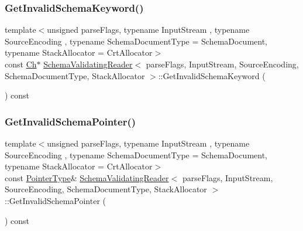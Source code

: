 \mbox{\label{classSchemaValidatingReader_ac3192b08923b4d68d04462b0b61ded1c}} 
\subsubsection{\texorpdfstring{Get\+Invalid\+Schema\+Keyword()}{GetInvalidSchemaKeyword()}}
{\footnotesize\ttfamily template$<$unsigned parse\+Flags, typename Input\+Stream , typename Source\+Encoding , typename Schema\+Document\+Type  = Schema\+Document, typename Stack\+Allocator  = Crt\+Allocator$>$ \\
const \hyperlink{classSchemaValidatingReader_a6eb6f887a49dbb400800ab4fc01f02c7}{Ch}$\ast$ \hyperlink{classSchemaValidatingReader}{Schema\+Validating\+Reader}$<$ parse\+Flags, Input\+Stream, Source\+Encoding, Schema\+Document\+Type, Stack\+Allocator $>$\+::Get\+Invalid\+Schema\+Keyword (\begin{DoxyParamCaption}{ }\end{DoxyParamCaption}) const\hspace{0.3cm}{\ttfamily [inline]}}

\mbox{\label{classSchemaValidatingReader_a9accbbcbe9afbbe26300d943ccb46362}} 
\subsubsection{\texorpdfstring{Get\+Invalid\+Schema\+Pointer()}{GetInvalidSchemaPointer()}}
{\footnotesize\ttfamily template$<$unsigned parse\+Flags, typename Input\+Stream , typename Source\+Encoding , typename Schema\+Document\+Type  = Schema\+Document, typename Stack\+Allocator  = Crt\+Allocator$>$ \\
const \hyperlink{classSchemaValidatingReader_a30ecf1b20ca5a1b79e0d5f4ceb3bf198}{Pointer\+Type}\& \hyperlink{classSchemaValidatingReader}{Schema\+Validating\+Reader}$<$ parse\+Flags, Input\+Stream, Source\+Encoding, Schema\+Document\+Type, Stack\+Allocator $>$\+::Get\+Invalid\+Schema\+Pointer (\begin{DoxyParamCaption}{ }\end{DoxyParamCaption}) const\hspace{0.3cm}{\ttfamily [inline]}}

